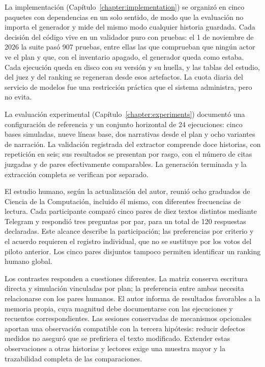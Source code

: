 \begin{conclusions}
La implementación (Capítulo~\ref{chapter:implementation}) se organizó en cinco paquetes con
dependencias en un solo sentido, de modo que la evaluación no importa el generador y mide del mismo
modo cualquier historia guardada. Cada decisión del código vive en un validador puro con pruebas: el 1
de noviembre de 2026 la suite pasó 907 pruebas, entre ellas las que comprueban que ningún actor ve el
plan y que, con el inventario apagado, el generador queda como estaba. Cada ejecución queda en disco con su
versión y su huella, y las tablas del estudio, del juez y del ranking se regeneran desde esos
artefactos. La cuota diaria
del servicio de modelos fue una restricción práctica que el sistema administra, pero no evita.

La evaluación experimental (Capítulo~\ref{chapter:experiments}) documentó una configuración de
referencia y un conjunto horizontal de 24 ejecuciones: cinco bases simuladas, nueve líneas base,
dos narrativas desde el plan y ocho variantes de narración. La validación registrada del extractor
comprende doce historias, con repetición en seis; sus resultados se presentan por rasgo, con el
número de citas juzgadas y de pares efectivamente comparables. La generación terminada y la
extracción completa se verifican por separado.

El estudio humano, según la actualización del autor, reunió ocho graduados de Ciencia de la
Computación, incluido él mismo, con diferentes frecuencias de lectura. Cada participante comparó
cinco pares de diez textos distintos mediante Telegram y respondió tres preguntas por par, para un
total de 120 respuestas declaradas. Este alcance describe la participación; las preferencias por
criterio y el acuerdo requieren el registro individual, que no se sustituye por los votos del
piloto anterior. Los cinco pares disjuntos tampoco permiten identificar un ranking humano global.

Los contrastes responden a cuestiones diferentes. La matriz conserva escritura directa y simulación
vinculadas por plan; la preferencia entre ambas necesita relacionarse con los pares humanos. El autor
informa de resultados favorables a la memoria propia, cuya magnitud debe documentarse con las
ejecuciones y recuentos correspondientes. Las sesiones conservadas de mecanismos opcionales aportan
una observación compatible con la tercera hipótesis: reducir defectos medidos no aseguró que se
prefiriera el texto modificado. Extender estas observaciones a otras historias y lectores exige una
muestra mayor y la trazabilidad completa de las comparaciones.


\end{conclusions}
